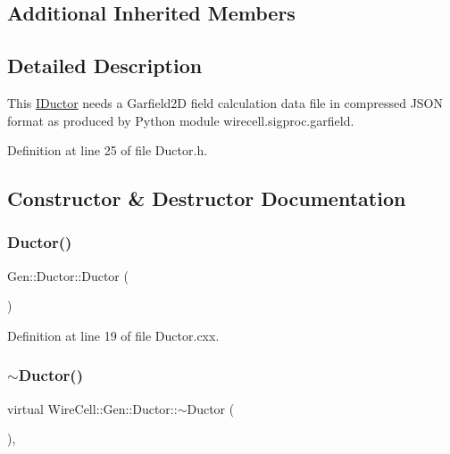\subsection*{Additional Inherited Members}


\subsection{Detailed Description}
This \hyperlink{class_wire_cell_1_1_i_ductor}{I\+Ductor} needs a Garfield2D field calculation data file in compressed J\+S\+ON format as produced by Python module wirecell.\+sigproc.\+garfield. 

Definition at line 25 of file Ductor.\+h.



\subsection{Constructor \& Destructor Documentation}
\mbox{\label{class_wire_cell_1_1_gen_1_1_ductor_aae745226fc466f6cab4b02e95c3338fb}} 
\subsubsection{\texorpdfstring{Ductor()}{Ductor()}}
{\footnotesize\ttfamily Gen\+::\+Ductor\+::\+Ductor (\begin{DoxyParamCaption}{ }\end{DoxyParamCaption})}



Definition at line 19 of file Ductor.\+cxx.

\mbox{\label{class_wire_cell_1_1_gen_1_1_ductor_a331c4314dba8472ab8c49dbc9112ff4b}} 
\subsubsection{\texorpdfstring{$\sim$\+Ductor()}{~Ductor()}}
{\footnotesize\ttfamily virtual Wire\+Cell\+::\+Gen\+::\+Ductor\+::$\sim$\+Ductor (\begin{DoxyParamCaption}{ }\end{DoxyParamCaption})\hspace{0.3cm}{\ttfamily [inline]}, {\ttfamily [virtual]}}



